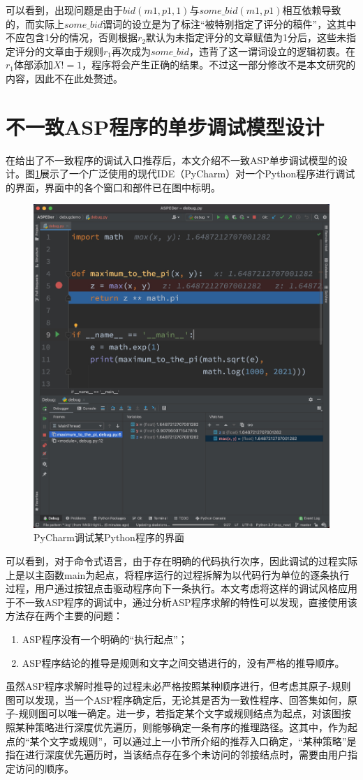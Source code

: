 \begin{example}
可以看到，出现问题是由于$bid(m1, p1, 1)$与$some\_bid(m1, p1)$相互依赖导致的，而实际上$some\_bid$谓词的设立是为了标注“被特别指定了评分的稿件”，这其中不应包含1分的情况，否则根据$r_2$默认为未指定评分的文章赋值为1分后，这些未指定评分的文章由于规则$r_1$再次成为$some\_bid$，违背了这一谓词设立的逻辑初衷。在$r_1$体部添加$X \mathrel{\mathtt{!=}} 1$，程序将会产生正确的结果。不过这一部分修改不是本文研究的内容，因此不在此处赘述。
\end{example}

\section{不一致ASP程序的单步调试模型设计}
在给出了不一致程序的调试入口推荐后，本文介绍不一致ASP单步调试模型的设计。图\ref{fig:dbgpycharm}展示了一个广泛使用的现代IDE（PyCharm）对一个Python程序进行调试的界面，界面中的各个窗口和部件已在图中标明。
\begin{figure}[t]
    \centering
    \includegraphics[height=.5\textwidth, valign=c]{figures/现代IDE调试界面.jpg}
    \caption{PyCharm调试某Python程序的界面}
    \label{fig:dbgpycharm}
\end{figure}
可以看到，对于命令式语言，由于存在明确的代码执行次序，因此调试的过程实际上是以主函数main为起点，将程序运行的过程拆解为以代码行为单位的逐条执行过程，用户通过按钮点击驱动程序向下一条执行。本文考虑将这样的调试风格应用于不一致ASP程序的调试中，通过分析ASP程序求解的特性可以发现，直接使用该方法存在两个主要的问题：
\begin{enumerate}[label=(\arabic*), topsep=0pt]
    \setlength\itemsep{-0.3em}
    \item ASP程序没有一个明确的“执行起点”；
    \item ASP程序结论的推导是规则和文字之间交错进行的，没有严格的推导顺序。
\end{enumerate}

虽然ASP程序求解时推导的过程未必严格按照某种顺序进行，但考虑其原子-规则图可以发现，当一个ASP程序确定后，无论其是否为一致性程序、回答集如何，原子-规则图可以唯一确定。进一步，若指定某个文字或规则结点为起点，对该图按照某种策略进行深度优先遍历，则能够确定一条有序的推理路径。这其中，作为起点的“某个文字或规则”，可以通过上一小节所介绍的推荐入口确定，“某种策略”是指在进行深度优先遍历时，当该结点存在多个未访问的邻接结点时，需要由用户指定访问的顺序。

